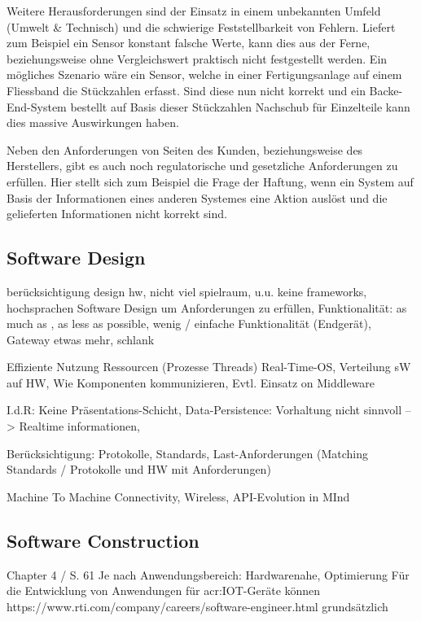 Weitere Herausforderungen sind der Einsatz in einem unbekannten Umfeld (Umwelt \& Technisch) und die schwierige Feststellbarkeit von Fehlern. Liefert zum Beispiel ein Sensor konstant falsche Werte, kann dies aus der Ferne, beziehungsweise ohne Vergleichswert praktisch nicht festgestellt werden. Ein mögliches Szenario wäre ein Sensor, welche in einer Fertigungsanlage auf einem Fliessband die Stückzahlen erfasst. Sind diese nun nicht korrekt und ein Backe-End-System bestellt auf Basis dieser Stückzahlen Nachschub für Einzelteile kann dies massive Auswirkungen haben.

Neben den Anforderungen von Seiten des Kunden, beziehungsweise des Herstellers, gibt es auch noch regulatorische und gesetzliche Anforderungen zu erfüllen. Hier stellt sich zum Beispiel die Frage der Haftung, wenn ein System auf Basis der Informationen eines anderen Systemes eine Aktion auslöst und die gelieferten Informationen nicht korrekt sind.



\subsection{Software Design}
berücksichtigung design hw, nicht viel spielraum, u.u. keine frameworks, hochsprachen
Software Design um Anforderungen zu erfüllen, Funktionalität: as much as , as less as possible, wenig / einfache Funktionalität (Endgerät), Gateway etwas mehr, schlank

Effiziente Nutzung Ressourcen (Prozesse Threads) Real-Time-OS, Verteilung sW auf HW, Wie Komponenten kommunizieren, Evtl. Einsatz on Middleware

I.d.R: Keine Präsentations-Schicht, Data-Persistence: Vorhaltung nicht sinnvoll --> Realtime informationen, 

Berücksichtigung: Protokolle, Standards, Last-Anforderungen (Matching Standards / Protokolle und HW mit Anforderungen)

Machine To Machine Connectivity, Wireless, API-Evolution in MInd



\subsection{Software Construction} Chapter 4 / S. 61
Je nach Anwendungsbereich: Hardwarenahe, Optimierung
Für die Entwicklung von Anwendungen für \gls{acr:IOT}-Geräte können
https://www.rti.com/company/careers/software-engineer.html grundsätzlich


